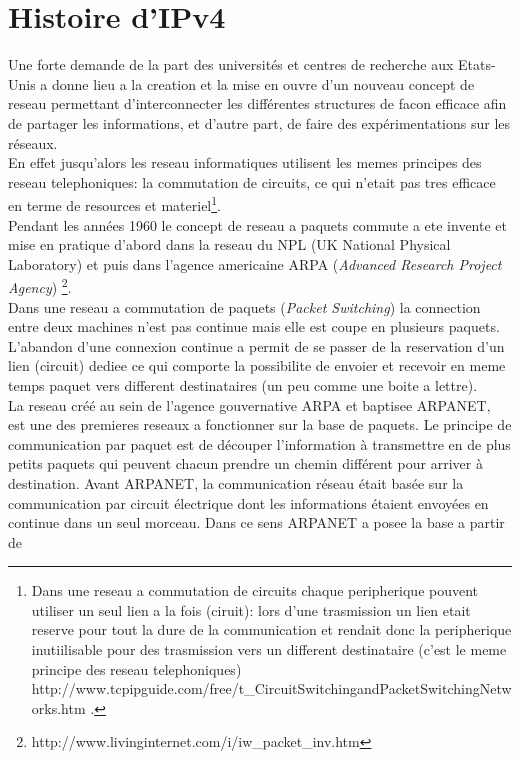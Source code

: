 \section{Histoire d'IPv4}
\label{sec:hist}

Une forte demande de la part des universités et centres de recherche aux
Etats-Unis a donne lieu a la creation et la mise en ouvre d'un nouveau concept
de reseau permettant d'interconnecter les différentes structures de facon
efficace afin de partager les informations, et d'autre part, de faire des
expérimentations sur les réseaux.
\\
En effet jusqu'alors les reseau informatiques utilisent les memes principes des
reseau telephoniques: la commutation de circuits, ce qui n'etait pas tres 
efficace en terme de resources et materiel\footnote {
Dans une reseau a commutation de circuits chaque peripherique pouvent utiliser
un seul lien a la fois (ciruit): lors d'une trasmission  un lien etait reserve
pour tout la dure de la communication et rendait donc la peripherique
inutiilisable pour des trasmission vers un different destinataire (c'est le meme
principe des reseau telephoniques)
http://www.tcpipguide.com/free/t\_CircuitSwitchingandPacketSwitchingNetworks.htm .}.
\\
Pendant les années 1960 le concept de reseau a paquets commute a ete invente et mise en 
pratique d'abord dans la reseau du NPL (UK National Physical Laboratory) et
puis dans l'agence americaine ARPA ({\it Advanced Research Project Agency})
\footnote {http://www.livinginternet.com/i/iw\_packet\_inv.htm}.
\\
Dans une reseau a commutation de paquets ({\it Packet Switching}) la connection
entre deux machines n'est pas continue mais elle est coupe en plusieurs
paquets.  L'abandon d'une connexion continue a permit de se passer de la
reservation d'un lien (circuit) dediee ce qui comporte la possibilite de
envoier et recevoir en meme temps paquet vers different destinataires (un peu
comme une boite a lettre). 
\\
La reseau créé au sein de l'agence gouvernative ARPA et baptisee ARPANET, est une
des premieres reseaux a fonctionner sur la base de paquets. Le principe de
communication par paquet est de découper l'information à transmettre en de plus
petits paquets qui peuvent chacun prendre un chemin différent pour arriver à
destination.  Avant ARPANET, la communication réseau était basée sur la
communication par circuit électrique dont les informations étaient envoyées en
continue dans un seul morceau. Dans ce sens ARPANET a posee la base a partir de 
